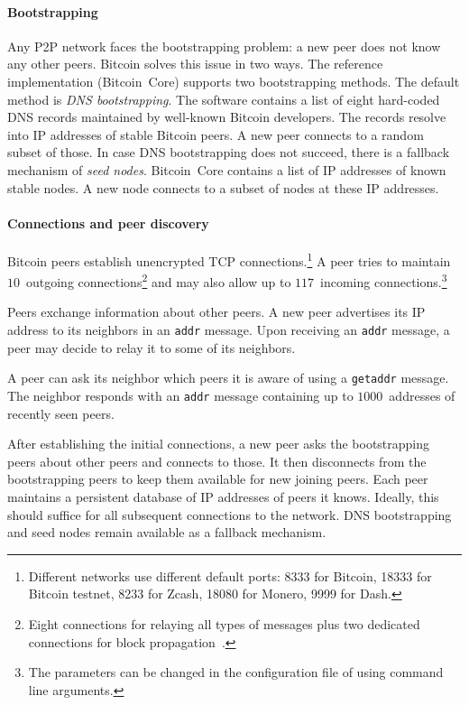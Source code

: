 \paragraph{Bootstrapping}

Any P2P network faces the bootstrapping problem: a new peer does not know any other peers.
Bitcoin solves this issue in two ways.
The reference implementation (Bitcoin~Core) supports two bootstrapping methods.
The default method is \textit{DNS bootstrapping}.
The software contains a list of eight hard-coded DNS records maintained by well-known Bitcoin developers.
The records resolve into IP addresses of stable Bitcoin peers.
A new peer connects to a random subset of those.
In case DNS bootstrapping does not succeed, there is a fallback mechanism of \textit{seed nodes}.
Bitcoin~Core contains a list of IP addresses of known stable nodes.
A new node connects to a subset of nodes at these IP addresses.


\paragraph{Connections and peer discovery}

Bitcoin peers establish unencrypted TCP connections.\footnote{Different networks use different default ports: 8333 for Bitcoin, 18333 for Bitcoin testnet, 8233 for Zcash, 18080 for Monero, 9999 for Dash.}
A peer tries to maintain $10$~outgoing connections\footnote{Eight connections for relaying all types of messages plus two dedicated connections for block propagation~\cite{Daftuar2019}.} and may also allow up to $117$~incoming connections.\footnote{The parameters can be changed in the configuration file of using command line arguments.}

Peers exchange information about other peers.
A new peer advertises its IP address to its neighbors in an \texttt{addr} message.
Upon receiving an \texttt{addr} message, a peer may decide to relay it to some of its neighbors.

A peer can ask its neighbor which peers it is aware of using a \texttt{getaddr} message.
The neighbor responds with an \texttt{addr} message containing up to $1000$~addresses of recently seen peers.

After establishing the initial connections, a new peer asks the bootstrapping peers about other peers and connects to those.
It then disconnects from the bootstrapping peers to keep them available for new joining peers.
Each peer maintains a persistent database of IP addresses of peers it knows.
Ideally, this should suffice for all subsequent connections to the network.
DNS bootstrapping and seed nodes remain available as a fallback mechanism.

